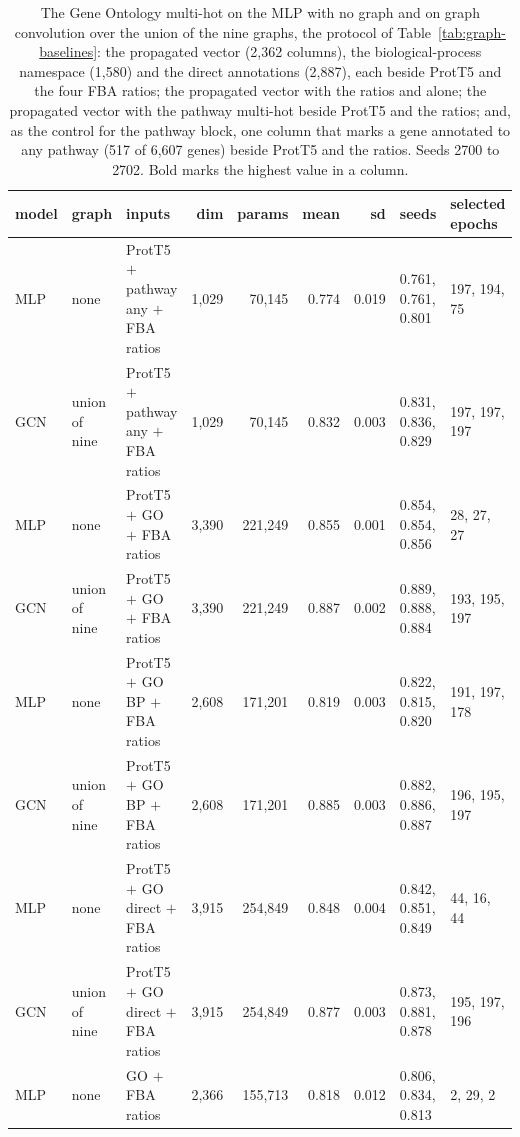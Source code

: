 \begin{table}[H]
  \centering
  \footnotesize
  \caption[The GO multi-hot, cheap models]{The Gene Ontology multi-hot on the MLP with no graph and on graph convolution over the union of the nine graphs, the protocol of Table~\ref{tab:graph-baselines}: the propagated vector (2,362 columns), the biological-process namespace (1,580) and the direct annotations (2,887), each beside ProtT5 and the four FBA ratios; the propagated vector with the ratios and alone; the propagated vector with the pathway multi-hot beside ProtT5 and the ratios; and, as the control for the pathway block, one column that marks a gene annotated to any pathway (517 of 6,607 genes) beside ProtT5 and the ratios. Seeds 2700 to 2702. Bold marks the highest value in a column.}
  \label{tab:graph-go}
  \begin{tabular}{@{}lllrrrrll@{}}
    \hline
    model & graph & inputs & dim & params & mean & sd & seeds & selected epochs \\
    \hline
    MLP & none & ProtT5 $+$ pathway any $+$ FBA ratios & 1,029 & 70,145 & 0.774 & 0.019 & 0.761, 0.761, 0.801 & 197, 194, 75 \\
    GCN & union of nine & ProtT5 $+$ pathway any $+$ FBA ratios & 1,029 & 70,145 & 0.832 & 0.003 & 0.831, 0.836, 0.829 & 197, 197, 197 \\
    MLP & none & ProtT5 $+$ GO $+$ FBA ratios & 3,390 & 221,249 & 0.855 & 0.001 & 0.854, 0.854, 0.856 & 28, 27, 27 \\
    GCN & union of nine & ProtT5 $+$ GO $+$ FBA ratios & 3,390 & 221,249 & 0.887 & 0.002 & 0.889, 0.888, 0.884 & 193, 195, 197 \\
    MLP & none & ProtT5 $+$ GO BP $+$ FBA ratios & 2,608 & 171,201 & 0.819 & 0.003 & 0.822, 0.815, 0.820 & 191, 197, 178 \\
    GCN & union of nine & ProtT5 $+$ GO BP $+$ FBA ratios & 2,608 & 171,201 & 0.885 & 0.003 & 0.882, 0.886, 0.887 & 196, 195, 197 \\
    MLP & none & ProtT5 $+$ GO direct $+$ FBA ratios & 3,915 & 254,849 & 0.848 & 0.004 & 0.842, 0.851, 0.849 & 44, 16, 44 \\
    GCN & union of nine & ProtT5 $+$ GO direct $+$ FBA ratios & 3,915 & 254,849 & 0.877 & 0.003 & 0.873, 0.881, 0.878 & 195, 197, 196 \\
    MLP & none & GO $+$ FBA ratios & 2,366 & 155,713 & 0.818 & 0.012 & 0.806, 0.834, 0.813 & 2, 29, 2 \\

\end{tabular}
\end{table}
